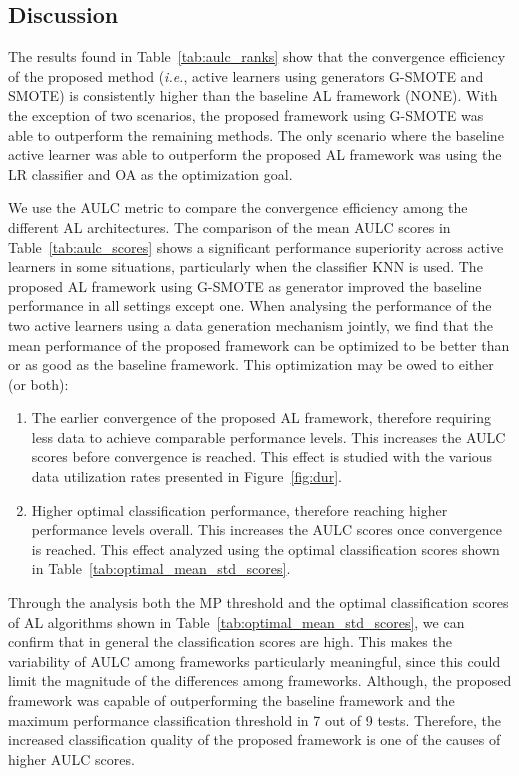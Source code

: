 \documentclass[preprint,12pt]{elsarticle}
\begin{document}
\subsection{Discussion}

The results found in Table~\ref{tab:aulc_ranks} show that the convergence
efficiency of the proposed method (\textit{i.e.}, active learners using
generators G-SMOTE and SMOTE) is consistently higher than the baseline AL
framework (NONE). With the exception of two scenarios, the proposed framework
using G-SMOTE was able to outperform the remaining methods. The only scenario
where the baseline active learner was able to outperform the proposed AL
framework was using the LR classifier and OA as the optimization goal.

We use the AULC metric to compare the convergence efficiency among the
different AL architectures. The comparison of the mean AULC scores in
Table~\ref{tab:aulc_scores} shows a significant performance superiority across
active learners in some situations, particularly when the classifier KNN is
used. The proposed AL framework using G-SMOTE as generator improved the
baseline performance in all settings except one. When analysing the
performance of the two active learners using a data generation mechanism
jointly, we find that the mean performance of the proposed framework can be
optimized to be better than or as good as the baseline framework. This
optimization may be owed to either (or both):

\begin{enumerate}
    \item The earlier convergence of the proposed AL framework, therefore
        requiring less data to achieve comparable performance levels. This
        increases the AULC scores before convergence is reached. This effect
        is studied with the various data utilization rates presented in
        Figure~\ref{fig:dur}.
    \item Higher optimal classification performance, therefore reaching higher
        performance levels overall. This increases the AULC scores once
        convergence is reached. This effect analyzed using the optimal
        classification scores shown in
        Table~\ref{tab:optimal_mean_std_scores}.
\end{enumerate} 

Through the analysis both the MP threshold and the optimal classification
scores of AL algorithms shown in Table~\ref{tab:optimal_mean_std_scores}, we
can confirm that in general the classification scores are high. This makes the
variability of AULC among frameworks particularly meaningful, since this could
limit the magnitude of the differences among frameworks. Although, the
proposed framework was capable of outperforming the baseline framework and the
maximum performance classification threshold in 7 out of 9 tests. Therefore,
the increased classification quality of the proposed framework is one of the
causes of higher AULC scores.
\end{document}
